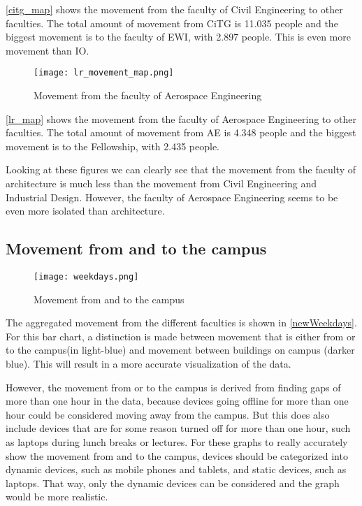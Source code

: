 \autoref{citg_map} shows the movement from the faculty of Civil Engineering to other faculties. The total amount of movement from CiTG is 11.035 people and the biggest movement is to the faculty of EWI, with 2.897 people. This is even more movement than IO.\\

\begin{figure}[H]
\centering
\texttt{[image: lr\_movement\_map.png]}
\captionsetup{justification=centering}
\caption{Movement from the faculty of Aerospace Engineering}
\label{lr_map}
\end{figure} 

\autoref{lr_map} shows the movement from the faculty of Aerospace Engineering to other faculties. The total amount of movement from AE is 4.348 people and the biggest movement is to the Fellowship, with 2.435 people. 

Looking at these figures we can clearly see that the movement from the faculty of architecture is much less than the movement from Civil Engineering and Industrial Design.  However, the faculty of Aerospace Engineering seems to be even more isolated than architecture. 

\subsection{Movement from and to the campus}
\begin{figure}[H]
\centering
\texttt{[image: weekdays.png]}
\captionsetup{justification=centering}
\caption{Movement from and to the campus}
\label{newWeekdays}
\end{figure} 
The aggregated movement from the different faculties is shown in \autoref{newWeekdays}. For this bar chart, a distinction is made between movement that is either from or to the campus(in light-blue) and movement between buildings on campus (darker blue). This will result in a more accurate visualization of the data.

However, the movement from or to the campus is derived from finding gaps of more than one hour in the data, because devices going offline for more than one hour could be considered moving away from the campus. But this does also include devices that are for some reason turned off for more than one hour, such as laptops during lunch breaks or lectures. For these graphs to really accurately show the movement from and to the campus, devices should be categorized into dynamic devices, such as mobile phones and tablets, and static devices, such as laptops. That way, only the dynamic devices can be considered and the graph would be more realistic.

